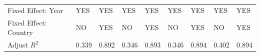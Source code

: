 \documentclass[12pt]{beamer}
\begin{document}
\begin{frame}[plain]
\begin{center}
\begin{table}[]
{\begin{tabular}{lllllllll}
Fixed Effect: Year                                & YES                                                               & YES                                                                & YES                                                               & YES                                                                & YES                                                               & YES                                                               & YES                                                               & YES                                                               \\
Fixed Effect: Country                             & NO                                                                & YES                                                                & NO                                                                & YES                                                                & NO                                                                & YES                                                               & NO                                                                & YES                                                               \\
Adjust $R^2$                                      & 0.339                                                             & 0.892                                                              & 0.346                                                             & 0.893                                                              & 0.346                                                             & 0.894                                                             & 0.402                                                             & 0.894                                                             \\ \hline
\end{tabular}}
\end{table}
\end{center}
\end{frame}
\end{document}
